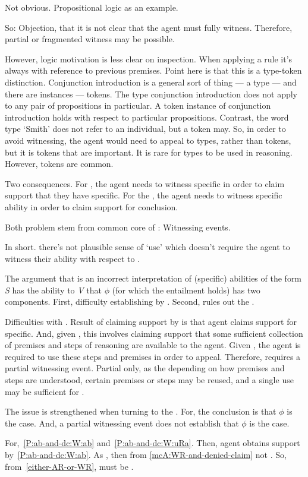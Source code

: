 \begin{note}[Proposition]
{    Not obvious.
    Propositional logic as an example.

    So: Objection, that it is not clear that the agent must fully witness.
    Therefore, partial or fragmented witness may be possible.

    However, logic motivation is less clear on inspection.
    When applying a rule it's always with reference to previous premises.
    Point here is that this is a type-token distinction.
    Conjunction introduction is a general sort of thing --- a type --- and there are instances --- tokens.
    The type conjunction introduction does not apply to any pair of propositions in particular.
    A token instance of conjunction introduction holds with respect to particular propositions.
    Contrast, the word type `Smith' does not refer to an individual, but a token may.
    So, in order to avoid witnessing, the agent would need to appeal to types, rather than tokens, but it is tokens that are important.
    It is rare for types to be used in reasoning.
    However, tokens are common.

    Two consequences.
    For \gsi{}, the agent needs to witness specific in order to claim support that they have specific.
    For the \aben{}, the agent needs to witness specific ability in order to claim support for conclusion.

    Both problem stem from common core of \WR{}: Witnessing events.

    In short. there's not plausible sense of `use' which doesn't require the agent to witness their ability with respect to \WR{}.
  }

  The argument that \WR{} is an incorrect interpretation of (specific) abilities of the form \emph{S} has the ability to \emph{V} that \(\phi\) (for which the \aben{} entailment holds) has two components.
  First, difficulty establishing by \gsi{}.
  Second, rules out the \aben{}.

  Difficulties with \gsi{}.
  Result of claiming support by \gsi{} is that agent claims support for specific.
  And, given \WR{}, this involves claiming support that some sufficient collection of premises and steps of reasoning are available to the agent.
  Given \ESU{}, the agent is required to use these steps and premises in order to appeal.
  Therefore, \ESU{} requires a partial witnessing event.
  Partial only, as the depending on how premises and steps are understood, certain premises or steps may be reused, and a single use may be sufficient for \ESU{}.

  The issue is strengthened when turning to the \aben{}.
  For, the conclusion is that \(\phi\) is the case.
  And, a partial witnessing event does not establish that \(\phi\) is the case.


  For,~\ref{P:ab-and-dc:W:ab} and~\ref{P:ab-and-dc:W:uRa}.
  Then, agent obtains support by~\ref{P:ab-and-dc:W:ab}.
  As \ESU{}, then from \ref{mcA:WR-and-denied-claim} not \WR{}.
  So, from~\ref{either-AR-or-WR}, must be \AR{}.
\end{note}

